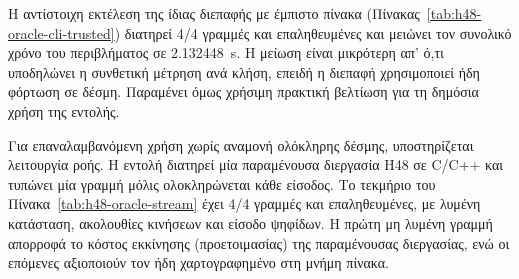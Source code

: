 \begin{table}[htbp]\centering

\caption[Τεκμήριο της εντολής δέσμης του μαντείου]{Τεκμήριο της δημόσιας εντολής  σε λειτουργία δέσμης: τέσσερις είσοδοι (λυμένη κατάσταση, ακολουθίες, ψηφίδες), όλες , με τις επιμέρους αναζητήσεις σε εκατοστά του δευτερολέπτου. Πηγή: τεκμήριο του  για το προφίλ .}
\label{tab:h48-oracle-cli}
\end{table}

Η αντίστοιχη εκτέλεση της ίδιας διεπαφής με έμπιστο πίνακα (Πίνακας~\ref{tab:h48-oracle-cli-trusted}) διατηρεί 4/4 γραμμές  και επαληθευμένες και μειώνει τον συνολικό χρόνο του περιβλήματος σε 2.132448~s. Η μείωση είναι μικρότερη απ' ό,τι υποδηλώνει η συνθετική μέτρηση ανά κλήση, επειδή η διεπαφή χρησιμοποιεί ήδη φόρτωση σε δέσμη. Παραμένει όμως χρήσιμη πρακτική βελτίωση για τη δημόσια χρήση της εντολής.

\begin{table}[htbp]\centering

\caption[Η εντολή του μαντείου με έμπιστο πίνακα]{Η εντολή  με έμπιστο πίνακα : 4/4 γραμμές  με μειωμένο συνολικό χρόνο περιβλήματος. Πηγή: τεκμήριο του  με επιλογή έμπιστου πίνακα.}
\label{tab:h48-oracle-cli-trusted}
\end{table}

Για επαναλαμβανόμενη χρήση χωρίς αναμονή ολόκληρης δέσμης, υποστηρίζεται λειτουργία ροής. Η εντολή  διατηρεί μία παραμένουσα διεργασία H48 σε C/C++ και τυπώνει μία γραμμή  μόλις ολοκληρώνεται κάθε είσοδος. Το τεκμήριο του Πίνακα~\ref{tab:h48-oracle-stream} έχει 4/4 γραμμές  και επαληθευμένες, με λυμένη κατάσταση, ακολουθίες κινήσεων και είσοδο ψηφίδων. Η πρώτη μη λυμένη γραμμή απορροφά το κόστος εκκίνησης (προετοιμασίας) της παραμένουσας διεργασίας, ενώ οι επόμενες αξιοποιούν τον ήδη χαρτογραφημένο στη μνήμη πίνακα.

\begin{table}[htbp]\centering

\caption[Λειτουργία ροής του μαντείου με παραμένουσα διεργασία]{Λειτουργία ροής της εντολής  με παραμένουσα διεργασία σε C/C++ και έμπιστο πίνακα: 4/4 γραμμές , με την πρώτη μη λυμένη γραμμή να απορροφά το κόστος ετοιμότητας. Πηγή: τεκμήριο του .}
\label{tab:h48-oracle-stream}
\end{table}

